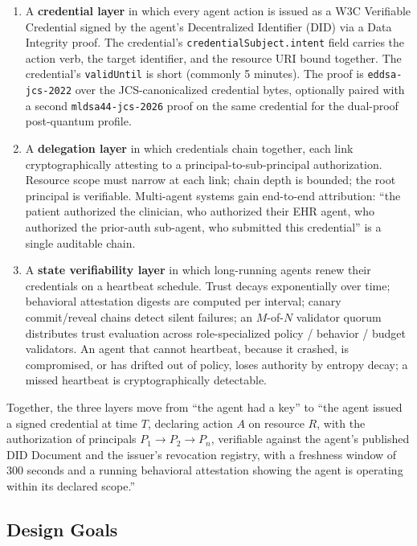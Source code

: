 \documentclass[11pt,a4paper,twocolumn]{article}
\begin{document}
\begin{enumerate}[label=\textbf{\arabic*.},leftmargin=*]
\item A \textbf{credential layer} in which every agent action is issued as a W3C Verifiable Credential signed by the agent's Decentralized Identifier (DID) via a Data Integrity proof. The credential's \verb|credentialSubject.intent| field carries the action verb, the target identifier, and the resource URI bound together. The credential's \verb|validUntil| is short (commonly 5 minutes). The proof is \texttt{eddsa-jcs-2022} over the JCS-canonicalized credential bytes, optionally paired with a second \texttt{mldsa44-jcs-2026} proof on the same credential for the dual-proof post-quantum profile.

\item A \textbf{delegation layer} in which credentials chain together, each link cryptographically attesting to a principal-to-sub-principal authorization. Resource scope must narrow at each link; chain depth is bounded; the root principal is verifiable. Multi-agent systems gain end-to-end attribution: ``the patient authorized the clinician, who authorized their EHR agent, who authorized the prior-auth sub-agent, who submitted this credential'' is a single auditable chain.

\item A \textbf{state verifiability layer} in which long-running agents renew their credentials on a heartbeat schedule. Trust decays exponentially over time; behavioral attestation digests are computed per interval; canary commit/reveal chains detect silent failures; an $M$-of-$N$ validator quorum distributes trust evaluation across role-specialized policy / behavior / budget validators. An agent that cannot heartbeat, because it crashed, is compromised, or has drifted out of policy, loses authority by entropy decay; a missed heartbeat is cryptographically detectable.
\end{enumerate}

Together, the three layers move from ``the agent had a key'' to ``the agent issued a signed credential at time $T$, declaring action $A$ on resource $R$, with the authorization of principals $P_1 \to P_2 \to P_n$, verifiable against the agent's published DID Document and the issuer's revocation registry, with a freshness window of 300 seconds and a running behavioral attestation showing the agent is operating within its declared scope.''

\subsection{Design Goals}
\end{document}
